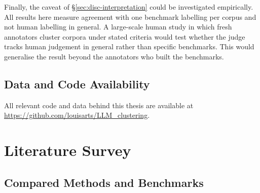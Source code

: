 \documentclass[11pt,a4paper,oneside]{report}
\begin{document}
Finally, the caveat of \S\ref{sec:disc-interpretation} could be investigated empirically. All results here measure agreement with one benchmark labelling per corpus and not human labelling in general. A large-scale human study in which fresh annotators cluster corpora under stated criteria would
test whether the judge tracks human judgement in general rather than specific benchmarks. This would generalise the result beyond the annotators who built the benchmarks.





\section*{Data and Code Availability}

All relevant code and data behind this thesis are available at
\url{https://github.com/louisarts/LLM_clustering}.


\clearpage



\clearpage
\appendix

\chapter{Literature Survey}\label{app:litstat}

\section{Compared Methods and Benchmarks}\label{app:roster}
\end{document}
